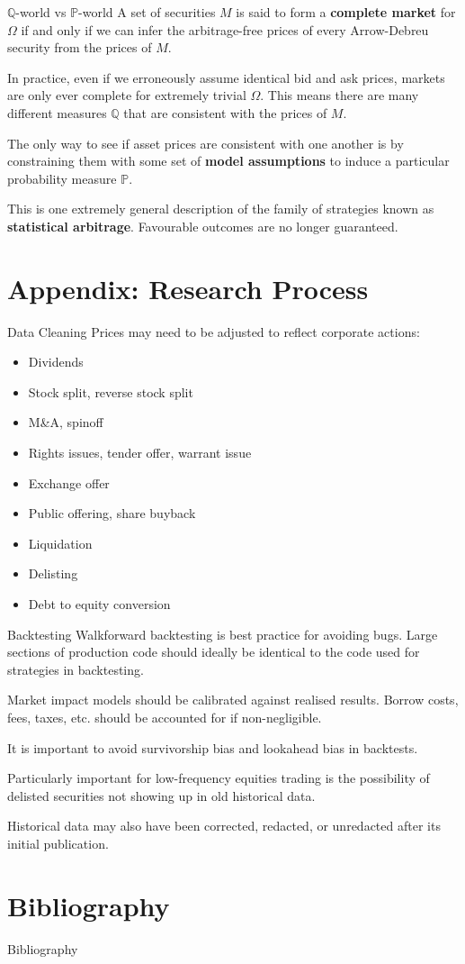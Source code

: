\documentclass{beamer}
\begin{document}
\begin{frame}{$\mathbb{Q}$-world vs $\mathbb{P}$-world}
	A set of securities $M$ is said to form a \textbf{complete market} for $\Omega$ if and only if we can infer the arbitrage-free prices of every Arrow-Debreu security from the prices of $M$.

	In practice, even if we erroneously assume identical bid and ask prices, markets are only ever complete for extremely trivial $\Omega$. This means there are many different measures $\mathbb{Q}$ that are consistent with the prices of $M$.

	The only way to see if asset prices are consistent with one another is by constraining them with some set of \textbf{model assumptions} to induce a particular probability measure $\mathbb{P}$.

	This is one extremely general description of the family of strategies known as \textbf{statistical arbitrage}. Favourable outcomes are no longer guaranteed.
\end{frame}

\section{Appendix: Research Process}
\begin{frame}{Data Cleaning}
	Prices may need to be adjusted to reflect corporate actions:
	\begin{itemize}
		\item Dividends
		\item Stock split, reverse stock split
		\item M&A, spinoff
		\item Rights issues, tender offer, warrant issue
		\item Exchange offer
		\item Public offering, share buyback
		\item Liquidation
		\item Delisting
		\item Debt to equity conversion
	\end{itemize}
\end{frame}

\begin{frame}{Backtesting}
	Walkforward backtesting is best practice for avoiding bugs. Large sections of production code should ideally be identical to the code used for strategies in backtesting.

	Market impact models should be calibrated against realised results. Borrow costs, fees, taxes, etc. should be accounted for if non-negligible.

	It is important to avoid survivorship bias and lookahead bias in backtests.

	Particularly important for low-frequency equities trading is the possibility of delisted securities not showing up in old historical data.

	Historical data may also have been corrected, redacted, or unredacted after its initial publication.
\end{frame}

\section{Bibliography}
\begin{frame}{Bibliography}
\end{frame}
\end{document}
